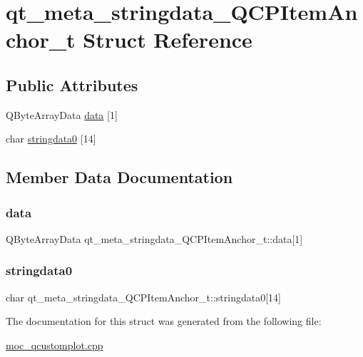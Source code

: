\hypertarget{structqt__meta__stringdata__QCPItemAnchor__t}{}\section{qt\+\_\+meta\+\_\+stringdata\+\_\+\+Q\+C\+P\+Item\+Anchor\+\_\+t Struct Reference}
\label{structqt__meta__stringdata__QCPItemAnchor__t}
\subsection*{Public Attributes}
\begin{DoxyCompactItemize}
\item 
Q\+Byte\+Array\+Data \mbox{\hyperlink{structqt__meta__stringdata__QCPItemAnchor__t_ab593c041f966a8f093e032b5b552399d}{data}} \mbox{[}1\mbox{]}
\item 
char \mbox{\hyperlink{structqt__meta__stringdata__QCPItemAnchor__t_aafbba7dee657bf2d44a9148e9e2c6b48}{stringdata0}} \mbox{[}14\mbox{]}
\end{DoxyCompactItemize}


\subsection{Member Data Documentation}
\mbox{\label{structqt__meta__stringdata__QCPItemAnchor__t_ab593c041f966a8f093e032b5b552399d}} 
\subsubsection{\texorpdfstring{data}{data}}
{\footnotesize\ttfamily Q\+Byte\+Array\+Data qt\+\_\+meta\+\_\+stringdata\+\_\+\+Q\+C\+P\+Item\+Anchor\+\_\+t\+::data\mbox{[}1\mbox{]}}

\mbox{\label{structqt__meta__stringdata__QCPItemAnchor__t_aafbba7dee657bf2d44a9148e9e2c6b48}} 
\subsubsection{\texorpdfstring{stringdata0}{stringdata0}}
{\footnotesize\ttfamily char qt\+\_\+meta\+\_\+stringdata\+\_\+\+Q\+C\+P\+Item\+Anchor\+\_\+t\+::stringdata0\mbox{[}14\mbox{]}}



The documentation for this struct was generated from the following file\+:\begin{DoxyCompactItemize}
\item 
\mbox{\hyperlink{moc__qcustomplot_8cpp}{moc\+\_\+qcustomplot.\+cpp}}\end{DoxyCompactItemize}
